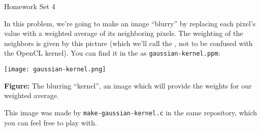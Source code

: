 \documentclass[11pt]{article}
\begin{document}
%
{Homework Set 4}

\bigskip
{}

In this problem, we're going to make an image ``blurry'' by replacing
each pixel's value with a weighted average of its neighboring pixels.
The weighting of the neighbors is given by this picture (which we'll
call the
,
not to be confused with the OpenCL kernel). You can find it in the
 as
\texttt{gaussian-kernel.ppm}:
\begin{center}
  \texttt{[image: gaussian-kernel.png]}

  \textbf{Figure:} The blurring ``kernel'', an
  image which will provide the weights for our weighted
  average.
\end{center}
This image was made by \texttt{make-gaussian-kernel.c} in the same
repository, which you can feel free to play with.
\end{document}
